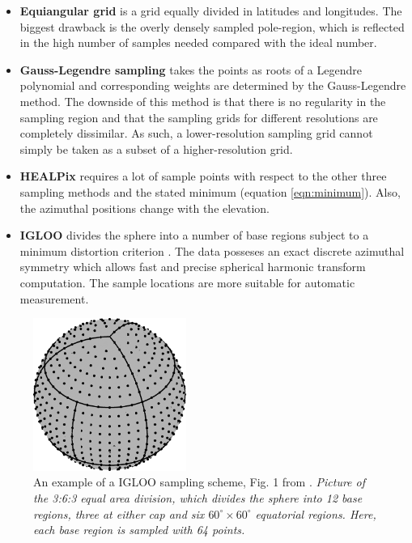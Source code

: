 \begin{itemize}
\item[]	\textbf{Equiangular grid} is a grid equally divided in latitudes and longitudes. The biggest drawback is the overly densely sampled pole-region, which is reflected in the high number of samples needed compared with the ideal number.
\item[]	\textbf{Gauss-Legendre sampling} takes the points as roots of a Legendre polynomial and corresponding weights are determined by the Gauss-Legendre method. The downside of this method is that there is no regularity in the sampling region and that the sampling grids for different resolutions are completely dissimilar. As such, a lower-resolution sampling grid cannot simply be taken as a subset of a higher-resolution grid.
\item[]	\textbf{HEALPix} requires a lot of sample points with respect to the other three sampling methods and the stated minimum (equation \eqref{eqn:minimum}). Also, the azimuthal positions change with the elevation.
\item[]	\textbf{IGLOO} divides the sphere into a number of base regions subject to a minimum distortion criterion \cite{Zhang2012575}. The data posseses an exact discrete azimuthal symmetry which allows fast and precise spherical harmonic transform computation. The sample locations are more suitable for automatic measurement.
\end{itemize}

\begin{figure}[t!]
    \centering
    \includegraphics[width=5cm]{afbeeldingen/Directivity_IGLOO.png}
    \caption[IGLOO sampling scheme from \cite{Zhang2012575}]{An example of a IGLOO sampling scheme, Fig. 1 from \cite{Zhang2012575}. \textit{Picture of the 3:6:3 equal area division, which divides the sphere into 12 base regions, three at either cap and six $60^\circ\times60^\circ$ equatorial regions. Here, each base region is sampled with 64 points.}}
    \label{fig:IGLOO}
\end{figure}

